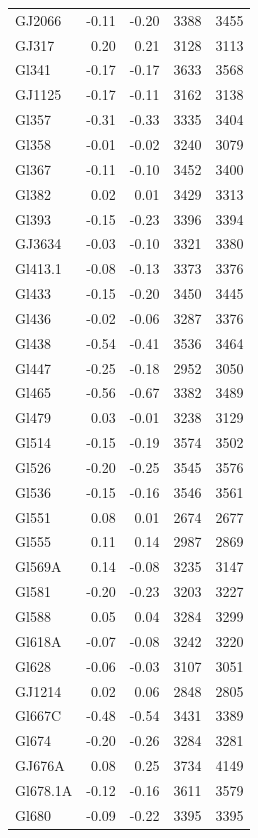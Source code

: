\documentclass{aa}
\begin{document}
\begin{table}[]
{\begin{tabular}{ l r r r r}
GJ2066 & -0.11 & -0.20 & 3388 & 3455 \\
GJ317 & 0.20 & 0.21 & 3128 & 3113 \\
Gl341 & -0.17 & -0.17 & 3633 & 3568 \\
GJ1125 & -0.17 & -0.11 & 3162 & 3138 \\
Gl357 & -0.31 & -0.33 & 3335 & 3404 \\
Gl358 & -0.01 & -0.02 & 3240 & 3079 \\
Gl367 & -0.11 & -0.10 & 3452 & 3400 \\
Gl382 & 0.02 & 0.01 & 3429 & 3313 \\
Gl393 & -0.15 & -0.23 & 3396 & 3394 \\
GJ3634 & -0.03 & -0.10 & 3321 & 3380 \\
Gl413.1 & -0.08 & -0.13 & 3373 & 3376 \\
Gl433 & -0.15 & -0.20 & 3450 & 3445 \\
Gl436 & -0.02 & -0.06 & 3287 & 3376 \\
Gl438 & -0.54 & -0.41 & 3536 & 3464 \\
Gl447 & -0.25 & -0.18 & 2952 & 3050 \\
Gl465 & -0.56 & -0.67 & 3382 & 3489 \\
Gl479 & 0.03 & -0.01 & 3238 & 3129 \\
Gl514 & -0.15 & -0.19 & 3574 & 3502 \\
Gl526 & -0.20 & -0.25 & 3545 & 3576 \\
Gl536 & -0.15 & -0.16 & 3546 & 3561 \\
Gl551 & 0.08 & 0.01 & 2674 & 2677 \\
Gl555 & 0.11 & 0.14 & 2987 & 2869 \\
Gl569A & 0.14 & -0.08 & 3235 & 3147 \\
Gl581 & -0.20 & -0.23 & 3203 & 3227 \\
Gl588 & 0.05 & 0.04 & 3284 & 3299 \\
Gl618A & -0.07 & -0.08 & 3242 & 3220 \\
Gl628 & -0.06 & -0.03 & 3107 & 3051 \\
GJ1214 & 0.02 & 0.06 & 2848 & 2805 \\
Gl667C & -0.48 & -0.54 & 3431 & 3389 \\
Gl674 & -0.20 & -0.26 & 3284 & 3281 \\
GJ676A & 0.08 & 0.25 & 3734 & 4149 \\
Gl678.1A & -0.12 & -0.16 & 3611 & 3579 \\
Gl680 & -0.09 & -0.22 & 3395 & 3395 \\

\end{tabular}}
\end{table}
\end{document}
